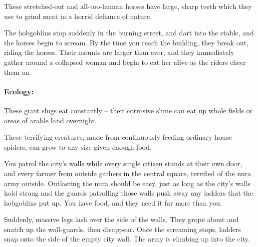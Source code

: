 \begin{multicols}{2}
\begin{boxtext}
\end{boxtext}



\label{nura_horse}
\nurahorse

These stretched-out and all-too-human horses have large, sharp teeth which they use to grind meat in a horrid defiance of nature.

\begin{boxtext}

  The hobgoblins stop suddenly in the burning street, and dart into the stable, and the horses begin to scream.
  By the time you reach the building, they break out, riding the horses.
  Their mounts are larger than ever, and they immediately gather around a collapsed woman and begin to eat her alive as the riders cheer them on.

\end{boxtext}

\label{nura_slug}

\paragraph{Ecology:} These giant slugs eat constantly -- their corrosive slime can eat up whole fields or areas of arable land overnight.


\label{nura_spider}

These terrifying creatures, made from continuously feeding ordinary house spiders, can grow to any size given enough food.

\begin{boxtext}

  You patrol the city's walls while every single citizen stands at their own door, and every farmer from outside gathers in the central square, terrified of the nura army outside.
  Outlasting the nura should be easy, just as long as the city's walls hold strong and the guards patrolling those walls push away any ladders that the hobgoblins put up.
  You have food, and they need it far more than you.

  Suddenly, massive legs lash over the side of the walls.
  They grope about and snatch up the wall-guards, then disappear.
  Once the screaming stops, ladders snap onto the side of the empty city wall.
  The army is climbing up into the city.


\end{boxtext}
\end{multicols}
